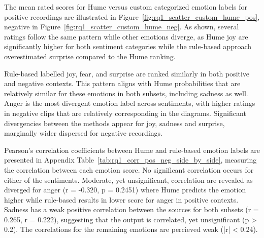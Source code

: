 The mean rated scores for Hume versus custom categorized emotion labels for positive recordings are illustrated in 
Figure~\ref{fig:rq1_scatter_custom_hume_pos}, negative in Figure~\ref{fig:rq1_scatter_custom_hume_neg}. As shown, several ratings follow the same 
pattern while other emotions diverge, as Hume joy are significantly higher for both sentiment categories while the rule-based approach overestimated surprise compared to the Hume ranking. 


Rule-based labelled joy, fear, and surprise are ranked similarly in both positive and negative contexts. This pattern aligns with Hume probabilities that are relatively similar for these emotions in both subsets, including sadness as well. 
Anger is the most divergent emotion label across sentiments, with higher ratings in negative clips that are relatively corresponding in the diagrams. Significant divergencies between the methods appear for joy, sadness and surprise, marginally wider dispersed for negative recordings. 


Pearson's correlation coefficients between Hume and rule-based emotion labels are presented in Appendix Table~\ref{tab:rq1_corr_pos_neg_side_by_side}, measuring the correlation between each emotion score. 
No significant correlation occurs for either of the sentiments. Moderate, yet unsignificant, correlation are revealed as diverged for anger (r = -0.320, p = 0.2451) where Hume predicts the emotion 
higher while rule-based results in lower score for anger in positive contexts. Sadness has a weak positive correlation between the sources for both subsets (r = 0.265, r = 0.222), suggesting that the output is correlated, yet unsignificant (p > 0.2). 
The correlations for the remaining emotions are percieved weak (|r| < 0.24). 

